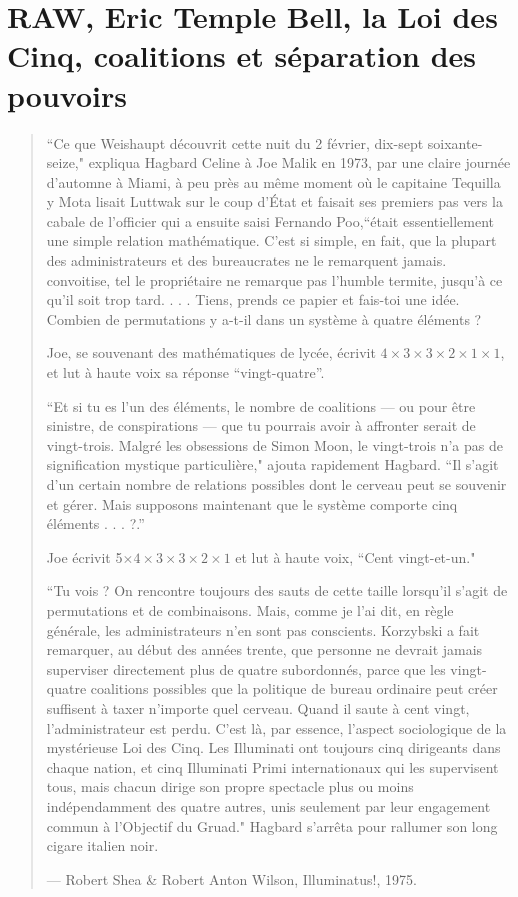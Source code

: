\chapter[Coalitions et séparation des pouvoirs]{RAW, Eric Temple Bell, la Loi des Cinq, coalitions et séparation des pouvoirs}

\blockquote{
\small{``Ce que Weishaupt découvrit cette nuit du 2 février, dix-sept soixante-seize," expliqua Hagbard Celine à Joe Malik en 1973, par une claire journée d'automne à Miami, à peu près au même moment où le capitaine Tequilla y Mota lisait Luttwak sur le coup d'État et faisait ses premiers pas vers la cabale de l'officier qui a ensuite saisi Fernando Poo,``était essentiellement une simple relation mathématique. C'est si simple, en fait, que la plupart des administrateurs et des bureaucrates ne le remarquent jamais. convoitise, tel le propriétaire ne remarque pas l'humble termite, jusqu'à ce qu'il soit trop tard. . . . Tiens, prends ce papier et fais-toi une idée. Combien de permutations y a-t-il dans un système à quatre éléments ?

Joe, se souvenant des mathématiques de lycée, écrivit $4\times3\times3\times2\times1\times1$, et lut à haute voix sa réponse ``vingt-quatre''.

``Et si tu es l'un des éléments, le nombre de coalitions --- ou pour être sinistre, de conspirations --- que tu pourrais avoir à affronter serait de vingt-trois. Malgré les obsessions de Simon Moon, le vingt-trois n'a pas de signification mystique particulière," ajouta rapidement Hagbard. ``Il s'agit d'un certain nombre de relations possibles dont le cerveau peut se souvenir et gérer. Mais supposons maintenant que le système comporte cinq éléments . . . ?.''

Joe écrivit 5$\times4\times3\times3\times2\times1$ et lut à haute voix, ``Cent vingt-et-un."

``Tu vois ? On rencontre toujours des sauts de cette taille lorsqu'il s'agit de permutations et de combinaisons. Mais, comme je l'ai dit, en règle générale, les administrateurs n'en sont pas conscients. Korzybski a fait remarquer, au début des années trente, que personne ne devrait jamais superviser directement plus de quatre subordonnés, parce que les vingt-quatre coalitions possibles que la politique de bureau ordinaire peut créer suffisent à taxer n'importe quel cerveau. Quand il saute à cent vingt, l'administrateur est perdu. C'est là, par essence, l'aspect sociologique de la mystérieuse Loi des Cinq. Les Illuminati ont toujours cinq dirigeants dans chaque nation, et cinq Illuminati Primi internationaux qui les supervisent tous, mais chacun dirige son propre spectacle plus ou moins indépendamment des quatre autres, unis seulement par leur engagement commun à l'Objectif du Gruad." Hagbard s'arrêta pour rallumer son long cigare italien noir.}
\par\begin{flushright} \textup{--- Robert Shea \& Robert Anton Wilson}, Illuminatus!, 1975. \end{flushright}
}

